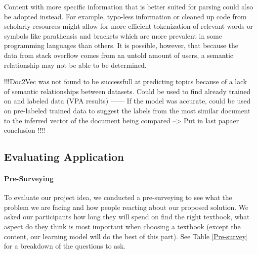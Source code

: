 Content with more specific information that is better suited for parsing could also be adopted instead. For example, typo-less information or cleaned up code from scholarly resources might allow for more efficient tokenization of relevant words or symbols like parathensis and brackets which are more prevalent in some programming languages than others. It is possible, however, that because the data from stack overflow comes from an untold amount of users, a semantic relationship may not be able to be determined. 

!!!Doc2Vec was not found to be successfull at predicting topics because of a lack of semantic relationships between datasets. Could be used to find already trained on and labeled data (VPA results) ------ If the model was accurate, could be used on pre-labeled trained data to suggest the labels from the most similar document to the inferred vector of the document being compared  --> Put in last papaer conclusion !!!!

\subsection{Evaluating Application}
\paragraph{Pre-Surveying}
To evaluate our project idea, we conducted a pre-surveying to see what the problem we are facing and how people reacting about our proposed solution. We asked our participants how long they will spend on find the right textbook, what aspect do they think is most important when choosing a textbook (except the content, our learning model will do the best of this part). See Table \ref{Pre-survey} for a breakdown of the questions to ask.

